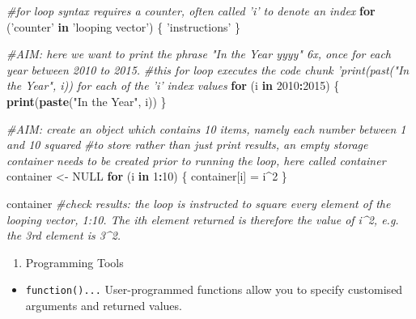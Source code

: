\documentclass[]{book}
\newenvironment{Shaded}{\begin{snugshade}}{\end{snugshade}}
\newcommand{\CommentTok}[1]{\textcolor[rgb]{0.56,0.35,0.01}{\textit{#1}}}
\newcommand{\ControlFlowTok}[1]{\textcolor[rgb]{0.13,0.29,0.53}{\textbf{#1}}}
\newcommand{\DecValTok}[1]{\textcolor[rgb]{0.00,0.00,0.81}{#1}}
\newcommand{\KeywordTok}[1]{\textcolor[rgb]{0.13,0.29,0.53}{\textbf{#1}}}
\newcommand{\NormalTok}[1]{#1}
\newcommand{\OperatorTok}[1]{\textcolor[rgb]{0.81,0.36,0.00}{\textbf{#1}}}
\newcommand{\OtherTok}[1]{\textcolor[rgb]{0.56,0.35,0.01}{#1}}
\newcommand{\StringTok}[1]{\textcolor[rgb]{0.31,0.60,0.02}{#1}}
\providecommand{\tightlist}{%
  \setlength{\itemsep}{0pt}\setlength{\parskip}{0pt}}
\begin{document}
\begin{Shaded}
\begin{Highlighting}[]
\CommentTok{#for loop syntax requires a counter, often called 'i' to denote an index}
\ControlFlowTok{for}\NormalTok{ (}\StringTok{'counter'} \ControlFlowTok{in} \StringTok{'looping vector'}\NormalTok{)}
\NormalTok{    \{}
    \StringTok{'instructions'}
\NormalTok{    \}}

\CommentTok{#AIM: here we want to print the phrase "In the Year yyyy" 6x, once for each year between 2010 to 2015.}
\CommentTok{#this for loop executes the code chunk 'print(past("In the Year", i)) for each of the 'i' index values}
\ControlFlowTok{for}\NormalTok{ (i }\ControlFlowTok{in} \DecValTok{2010}\OperatorTok{:}\DecValTok{2015}\NormalTok{)}
\NormalTok{    \{}
    \KeywordTok{print}\NormalTok{(}\KeywordTok{paste}\NormalTok{(}\StringTok{"In the Year"}\NormalTok{, i))}
\NormalTok{    \}}

\CommentTok{#AIM: create an object which contains 10 items, namely each number between 1 and 10 squared}
\CommentTok{#to store rather than just print results, an empty storage container needs to be created prior to running the loop, here called container}
\NormalTok{container <-}\StringTok{ }\OtherTok{NULL}
\ControlFlowTok{for}\NormalTok{ (i }\ControlFlowTok{in} \DecValTok{1}\OperatorTok{:}\DecValTok{10}\NormalTok{)}
\NormalTok{    \{}
\NormalTok{    container[i] =}\StringTok{ }\NormalTok{i}\OperatorTok{^}\DecValTok{2}
\NormalTok{    \}}

\NormalTok{container }\CommentTok{#check results: the loop is instructed to square every element of the looping vector, 1:10. The ith element returned is therefore the value of i^2, e.g. the 3rd element is 3^2.}
\end{Highlighting}
\end{Shaded}

\begin{enumerate}
\def\labelenumi{\arabic{enumi}.}
\setcounter{enumi}{21}
\tightlist
\item
  Programming Tools
\end{enumerate}

\begin{itemize}
\tightlist
\item
  \texttt{function()...}
  User-programmed functions allow you to specify customised arguments and returned values.
\end{itemize}
\end{document}

